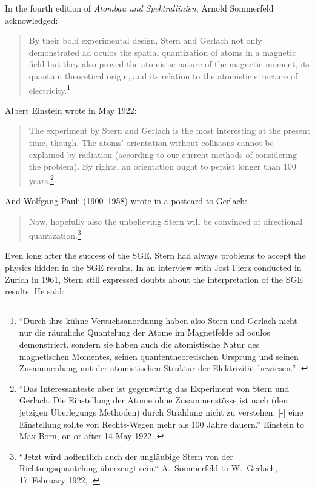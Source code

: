 \documentclass{article}
\begin{document}
In the fourth edition of \emph{Atombau und Spektrallinien}, Arnold Sommerfeld acknowledged:
\begin{quote}
By their bold experimental design, Stern and Gerlach not only demonstrated ad oculos the spatial quantization of atoms in a magnetic field but they also proved the atomistic nature of the magnetic moment, its quantum theoretical origin, and its relation to the atomistic structure of electricity.\footnote{``Durch ihre kühne Versuchsanordnung haben also Stern und Gerlach nicht nur die räumliche Quantelung der Atome im Magnetfelde ad oculos demonstriert, sondern sie haben auch die atomistische Natur des magnetischen Momentes, seinen quantentheoretischen Ursprung und seinen Zusammenhang mit der atomistischen Struktur der Elektrizität bewiesen.''
\cite[p.~149]{SommerfeldA1924Atombau4}.}
\end{quote}
Albert Einstein wrote in May 1922:
\begin{quote}
The experiment by Stern and Gerlach is the most interesting at the present time, though. The atoms' orientation without collisions cannot be explained by radiation (according to our current methods of considering the problem). By rights, an orientation ought to persist longer than 100 years.\footnote{``Das Interessanteste aber ist gegenwärtig das Experiment von Stern und Gerlach. Die Einstellung  der Atome ohne Zusammenstösse ist nach (den jetzigen Überlegungs Methoden) durch Strahlung nicht zu verstehen. [-] eine Einstellung sollte von Rechts-Wegen mehr als 100 Jahre dauern.''  Einstein to Max Born, on or after 14 May 1922 \cite[Doc.~190]{CPAE13}.}
\end{quote}
And Wolfgang Pauli (1900--1958) wrote in a postcard to Gerlach: 
\begin{quote}
Now, hopefully also the unbelieving Stern will be convinced of directional quantization.\footnote{``Jetzt wird hoffentlich auch der ungläubige Stern von der Richtungsquantelung überzeugt sein.“ 
A.~Sommerfeld to W.~Gerlach, 17~February 1922, \cite[p.~55]{PauliW1979Briefwechsel}.}
\end{quote}
Even long after the success of the SGE, Stern had always problems to accept the physics hidden in the SGE results. In an interview with Jost Fierz conducted in Zurich in 1961, Stern still expressed doubts about the interpretation of the SGE results. He said: 
\end{document}
